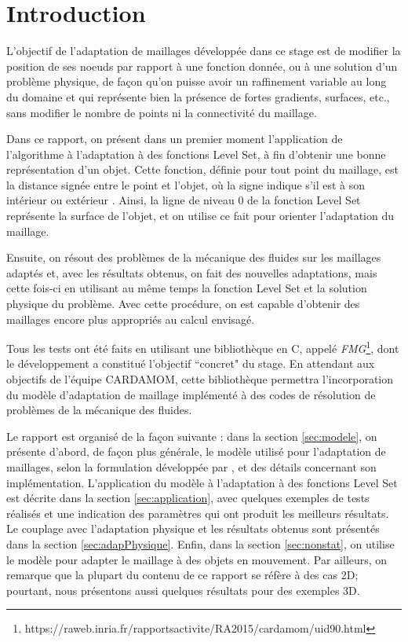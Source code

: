 \section{Introduction}

\indent L'objectif de l'adaptation de maillages développée dans ce stage est de modifier la position de ses noeuds par rapport à une fonction donnée, ou à une solution d'un problème physique, de façon qu'on puisse avoir un raffinement variable au long du domaine et qui représente bien la présence de fortes gradients, surfaces, etc., sans modifier le nombre de points ni la connectivité du maillage.

\indent Dans ce rapport, on présent dans un premier moment l'application de l'algorithme à l'adaptation à des fonctions Level Set, à fin d'obtenir une bonne représentation d'un objet. Cette fonction, définie pour tout point du maillage, est la distance signée entre le point et l'objet, où la signe indique s'il est à son intérieur ou extérieur \cite{ducrot}. Ainsi, la ligne de niveau 0 de la fonction Level Set représente la surface de l'objet, et on utilise ce fait pour orienter l'adaptation du maillage.

\indent Ensuite, on résout des problèmes de la mécanique des fluides sur les maillages adaptés et, avec les résultats obtenus, on fait des nouvelles adaptations, mais cette fois-ci en utilisant au même temps la fonction Level Set et la solution physique du problème. Avec cette procédure, on est capable d'obtenir des maillages encore plus appropriés au calcul envisagé.

\indent Tous les tests ont été faits en utilisant une bibliothèque en C, appelé \emph{FMG}\footnote{https://raweb.inria.fr/rapportsactivite/RA2015/cardamom/uid90.html}, dont le développement a constitué l'objectif ``concret" du stage. En attendant aux objectifs de l'équipe CARDAMOM, cette bibliothèque permettra l'incorporation du modèle d'adaptation de maillage implémenté à des codes de résolution de problèmes de la mécanique des fluides. 

\indent Le rapport est organisé de la façon suivante : dans la section \ref{sec:modele}, on présente d'abord, de façon plus générale, le modèle utilisé pour l'adaptation de maillages, selon la formulation développée par \cite{arpaia}, et des détails concernant son implémentation. L'application du modèle à l'adaptation à des fonctions Level Set est décrite dans la section \ref{sec:application}, avec quelques exemples de tests réalisés et une indication des paramètres qui ont produit les meilleurs résultats. Le couplage avec l'adaptation physique et les résultats obtenus sont présentés dans la section \ref{sec:adapPhysique}. Enfin, dans la section \ref{sec:nonstat}, on utilise le modèle pour adapter le maillage à des objets en mouvement. Par ailleurs, on remarque que la plupart du contenu de ce rapport se réfère à des cas 2D; pourtant, nous présentons aussi quelques résultats pour des exemples 3D.


